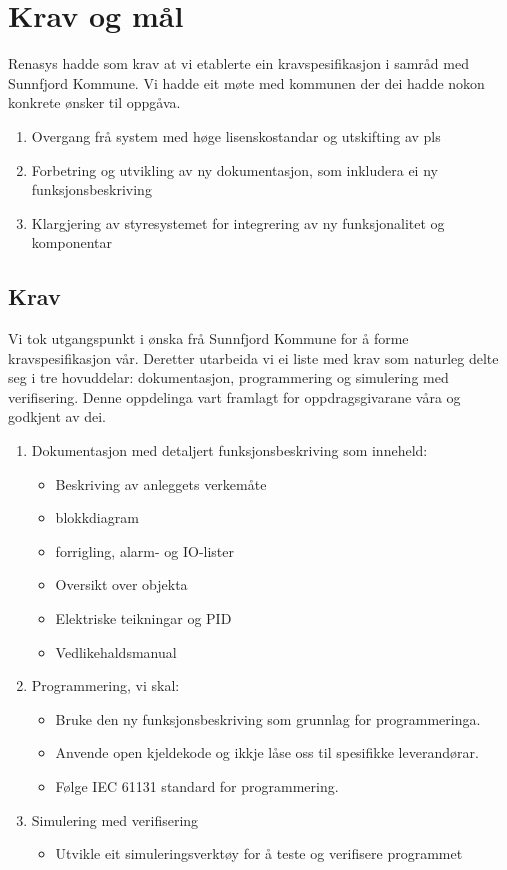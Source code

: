 \chapter{Krav og mål}
\thispagestyle{fancy}
\gls{Renasys} hadde som krav at vi etablerte ein kravspesifikasjon i samråd med \gls{Sunnfjord Kommune}.
Vi hadde eit møte med kommunen der dei hadde nokon konkrete ønsker til oppgåva.

\begin{enumerate}
    \item Overgang frå system med høge lisenskostandar og utskifting av pls
    \item Forbetring og utvikling av ny dokumentasjon, som inkludera ei ny funksjonsbeskriving 
    \item Klargjering av styresystemet for integrering av ny funksjonalitet og komponentar
\end{enumerate}

\section{Krav}
Vi tok utgangspunkt i ønska frå \gls{Sunnfjord Kommune} for å forme kravspesifikasjon vår.
Deretter utarbeida vi ei liste med krav som naturleg delte seg i tre
hovuddelar: dokumentasjon, programmering og simulering med verifisering. Denne oppdelinga vart framlagt for oppdragsgivarane våra og godkjent av dei. 



\begin{enumerate}
    \item Dokumentasjon med detaljert funksjonsbeskriving som inneheld:
        \begin{itemize} 
        \item Beskriving av anleggets verkemåte
        \item \gls{blokkdiagram}
        \item \gls{forrigling}, \gls{alarm}- og \gls{IO}-lister
        \item Oversikt over objekta
        \item Elektriske teikningar og \gls{PID}
        \item Vedlikehaldsmanual
        \end{itemize}
    \item Programmering, vi skal:
        \begin{itemize}
        \item Bruke den ny funksjonsbeskriving som grunnlag for programmeringa.
        \item Anvende open kjeldekode og ikkje låse oss til spesifikke leverandørar.
        \item Følge \gls{IEC} 61131 standard for programmering.
        \end{itemize}
    \item Simulering med verifisering
        \begin{itemize}
        \item Utvikle eit simuleringsverktøy for å teste og verifisere programmet
        \end{itemize}
\end{enumerate}

